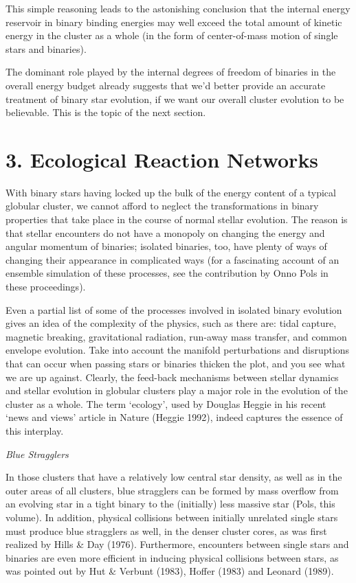 This simple reasoning leads to the astonishing conclusion that the
internal energy reservoir in binary binding energies may well exceed
the total amount of kinetic energy in the cluster as a whole (in the
form of center-of-mass motion of single stars and binaries).

The dominant role played by the internal degrees of freedom of
binaries in the overall energy budget already suggests that we'd
better provide an accurate treatment of binary star evolution, if we
want our overall cluster evolution to be believable.  This is the
topic of the next section.

\section{3. Ecological Reaction Networks}

With binary stars having locked up the bulk of the energy content of a
typical globular cluster, we cannot afford to neglect the
transformations in binary properties that take place in the course of
normal stellar evolution.  The reason is that stellar encounters do
not have a monopoly on changing the energy and angular momentum of
binaries; isolated binaries, too, have plenty of ways of changing
their appearance in complicated ways (for a fascinating account of an
ensemble simulation of these processes, see the contribution by Onno
Pols in these proceedings).

Even a partial list of some of the processes involved in isolated
binary evolution gives an idea of the complexity of the physics, such
as there are: tidal capture, magnetic breaking, gravitational
radiation, run-away mass transfer, and common envelope evolution.
Take into account the manifold perturbations and disruptions that can
occur when passing stars or binaries thicken the plot, and you see
what we are up against.  Clearly, the feed-back mechanisms between
stellar dynamics and stellar evolution in globular clusters play a
major role in the evolution of the cluster as a whole.  The term
`ecology', used by Douglas Heggie in his recent `news and views'
article in Nature (Heggie 1992), indeed captures the essence
of this interplay.

\bigskip
\noindent
{\it Blue Stragglers}
\medskip

In those clusters that have a relatively low central star density, as
well as in the outer areas of all clusters, blue stragglers can be
formed by mass overflow from an evolving star in a tight binary to the
(initially) less massive star (Pols, this volume).  In addition,
physical collisions between initially unrelated single stars must
produce blue stragglers as well, in the denser cluster cores, as was
first realized by Hills \& Day (1976).  Furthermore, encounters
between single stars and binaries are even more efficient in inducing
physical collisions between stars, as was pointed out by Hut \&
Verbunt (1983), Hoffer (1983) and Leonard (1989).


